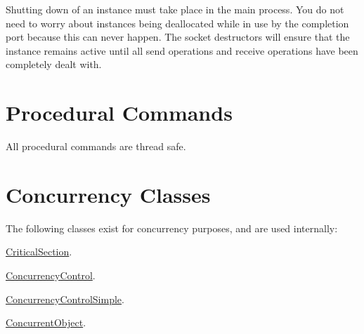 Shutting down of an instance must take place in the main process. You do not need to worry about instances being deallocated while in use by the completion port because this can never happen. The socket destructors will ensure that the instance remains active until all send operations and receive operations have been completely dealt with.\hypertarget{multithreading_page_mtProcedural}{}\section{Procedural Commands}\label{multithreading_page_mtProcedural}
All procedural commands are thread safe.\par
\par
\hypertarget{multithreading_page_mtClasses}{}\section{Concurrency Classes}\label{multithreading_page_mtClasses}
The following classes exist for concurrency purposes, and are used internally:
\begin{DoxyItemize}
\item \hyperlink{class_critical_section}{CriticalSection}.
\item \hyperlink{class_concurrency_control}{ConcurrencyControl}.
\item \hyperlink{class_concurrency_control_simple}{ConcurrencyControlSimple}.
\item \hyperlink{class_concurrent_object}{ConcurrentObject}. 
\end{DoxyItemize}